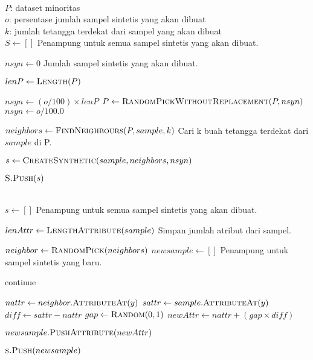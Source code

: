 \begin{center}
	\label{alg:smote}
	\begin{algorithmic}[1]
\Require \\
$ P $: dataset minoritas \\
$ o $: persentase jumlah sampel sintetis yang akan dibuat \\
$ k $: jumlah tetangga terdekat dari sampel yang akan dibuat
\\
	\State $ S \gets [] $
	\Comment Penampung untuk semua sampel sintetis yang akan dibuat.

	\State $ nsyn \gets 0 $
	\Comment Jumlah sampel sintetis yang akan dibuat.

	\State $ lenP \gets \Call{Length}{P} $

		\label{o_less_100}
		\State $ nsyn \gets (o / 100) \times lenP $
		\State $ P \gets \Call{RandomPickWithoutReplacement}{P, nsyn} $
	\Else
		\State $ nsyn \gets o / 100.0 $
	\EndIf

		\State $ neighbors \gets \Call{FindNeighbours}{P, sample, k} $
		\Comment Cari k buah tetangga terdekat dari $sample$ di P.

		\State $ s \gets \Call{CreateSynthetic}{sample, neighbors, nsyn} $

		\State $ \Call{S.Push}{s} $
	\EndFor

	\State {}
\EndFunction
\\
	\State $ s \gets [] $
	\Comment Penampung untuk semua sampel sintetis yang akan dibuat.

	\State $ lenAttr \gets \Call{LengthAttribute}{sample} $
	\Comment Simpan jumlah atribut dari sampel.

		\State $ neighbor \gets \Call{RandomPick}{neighbors} $
		\State $ newsample \gets [] $
		\Comment Penampung untuk sampel sintetis yang baru.

				\State continue
			\EndIf

			\State $ nattr \gets neighbor.\Call{AttributeAt}{y} $
			\State $ sattr \gets sample.\Call{AttributeAt}{y} $
			\State $ diff \gets sattr - nattr $
			\State $ gap \gets \Call{Random}{0,1} $
			\State $ newAttr \gets nattr + (gap \times diff) $

			\State $ newsample.\Call{PushAttribute}{newAttr} $
		\EndFor

		\State $ \Call{s.Push}{newsample} $
	\EndFor

	\State {}
\EndFunction

	\end{algorithmic}
\end{center}

